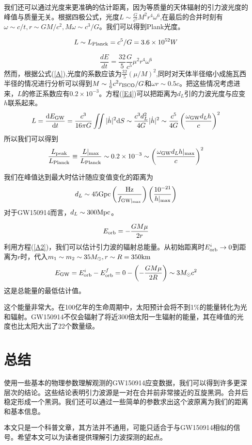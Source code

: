 \documentclass[UTF8]{ctexart}
\begin{document}
我们还可以通过光度来更准确的估计距离，因为等质量的天体辐射的引力波光度的峰值与质量无关。根据四极公式，光度$L\sim \frac{G}{c^5}M^2r^4\omega^6$,在最后的合并时刻有$\omega\sim c/t,r\sim GM/c^2,M\omega\sim c^3/G$。我们可以得到Plank光度。

\begin{equation}
L\sim L_{\rm Planck}=c^5/G=3.6\times10^{52}W
\end{equation}

\begin{equation}
\label{A}
\frac{dE}{dt}=\frac{32}{5}\frac{G}{c^5}\mu^2r^4\omega^6
\end{equation}
然而，根据公式(\ref{A}),光度的系数应该为$\frac{32}{5}({\mu}/{M})^2$,同时对天体半径缩小成施瓦西半径的情况进行分析可以得到$M\sim \frac{1}{6}c^2r_{\rm ISCO}/G$和$\omega r\sim 0.5c$。把这些情况考虑进来，$L$的修正系数应有$0.2\times 10^{-3}$。方程(\ref{E4})可以把距离为$d_L$引的力波光度与应变$h$联系起来。
\begin{equation}
L=\frac{{\rm d}E_{\rm GW}}{{\rm d}t}=\frac{c^3}{16\pi G}\iint|\dot{h}|^2{\rm d}S\sim\frac{c^3d_L^2}{4G}|\dot{h}|^2\sim\frac{c^5}{4G}\left(\frac{\omega_{\rm GW}d_Lh}{c}\right)^2
\end{equation}
所以我们可以得到
\begin{equation}
\frac{L_{\rm peak}}{L_{\rm Planck}} \equiv \frac{L|_{\rm max}}{L_{\rm Planck}}\sim 0.2\times 10^{-3}\sim \left(\frac{\omega_{\rm GW}d_Lh|_{\rm max}}{c}\right)^2 
\end{equation}

我们在峰值达到最大时估计随应变值变化的距离为
\begin{equation}
d_L\sim 45{\rm Gpc}\left(\frac{\rm Hz}{f_{\rm GW|_{\rm max}}}\right) \left(\frac{10^{-21}}{h|_{\rm max}}\right)
\end{equation}
对于GW150914而言，$d_L\sim 300{\rm Mpc}$。

\begin{equation}
\label{A2}
E_{\rm orb} = -\frac{GM\mu}{2r}
\end{equation}
利用方程(\ref{A2})，我们可以估计引力波的辐射总能量。从初始距离时$E_{\rm orb}^i\to0$到距离为$r$时，代入$m_1\sim m_2\sim35M_\odot,r\sim R = 350{\rm km}$
\begin{equation}
E_{\rm GW}=E_{\rm orb}^i-E_{\rm orb}^f = 0-\left(-\frac{GM\mu}{2R}\right)\sim3M_\odot c^2
\end{equation}
这是总能量的最低估计值。

这个能量非常大。在100亿年的生命周期中，太阳预计会将不到1\%的能量转化为光和辐射。GW150914不仅会辐射了将近300倍太阳一生辐射的能量，其在峰值的光度也比太阳大出了22个数量级。
\section{总结}
使用一些基本的物理参数理解观测的GW150914应变数据，我们可以得到许多更深层次的结论。这些结论表明引力波源是一对在合并前非常接近的互旋黑洞。合并后稳定形成一个黑洞。我们还可以通过一些简单的参数求出这个波原离为我们的距离和基本信息。

本文只是一个科普文章，其方法并不通用，可能只适合于与GW150914相似的信号。希望本文可以为读者提供理解引力波探测的起点。
\end{document}

